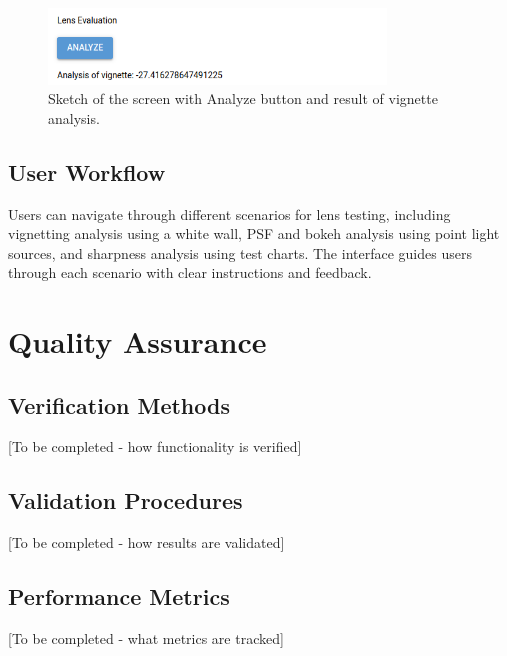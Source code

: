 \begin{figure}[h]
\centering
\includegraphics[width=0.8\textwidth]{Images/ui2.png}
\caption{Sketch of the screen with Analyze button and result of vignette analysis.}
\label{fig:ui_analysis_screen}
\end{figure}

\subsection{User Workflow}
Users can navigate through different scenarios for lens testing, including vignetting analysis using a white wall, PSF and bokeh analysis using point light sources, and sharpness analysis using test charts. The interface guides users through each scenario with clear instructions and feedback.

\section{Quality Assurance}

\subsection{Verification Methods}
[To be completed - how functionality is verified]

\subsection{Validation Procedures}
[To be completed - how results are validated]

\subsection{Performance Metrics}
[To be completed - what metrics are tracked]

